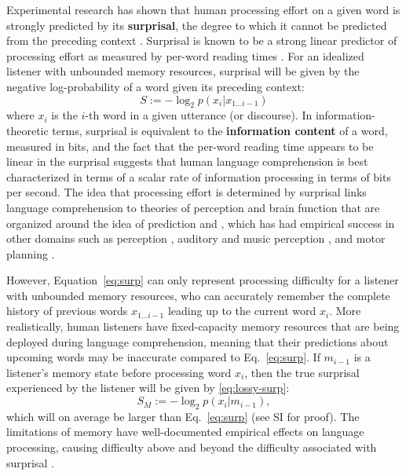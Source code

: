 \documentclass[12pt]{article}
\begin{document}
Experimental research has shown that human processing effort on a given word is strongly predicted by its \textbf{surprisal}, the degree to which it cannot be predicted from the preceding context \citep{hale2001probabilistic,levy2008expectation}.
Surprisal is known to be a strong linear predictor of processing effort as measured by per-word reading times \citep{smith2013effect}.
For an idealized listener with unbounded memory resources, surprisal will be given by the negative log-probability of a word given its preceding context:
\begin{equation}\label{eq:surp}
	S :=	-\log_2 p(x_i|x_{1...i-1})
\end{equation}
where $x_i$ is the $i$-th word in a given utterance (or discourse). In information-theoretic terms, surprisal is equivalent to the \textbf{information content} of a word, measured in bits, and the fact that the per-word reading time appears to be linear in the surprisal suggests that human language comprehension is best characterized in terms of a scalar rate of information processing in terms of bits per second. The idea that processing effort is determined by surprisal links language comprehension to theories of perception and brain function that are organized around the idea of prediction and  \citep{friston2009predictive,friston2010free,clark2013whatever}, which has had empirical success in other domains such as perception \citep{egner2010expectation}, auditory and music perception \citep{agres2018information}, and motor planning \citep{wolpert2001motor}.

However, Equation~\ref{eq:surp} can only represent processing difficulty for a listener with unbounded memory resources, who can accurately remember the complete history of previous words $x_{1...i-1}$ leading up to the current word $x_i$. More realistically, human listeners have fixed-capacity memory resources that are being deployed during language comprehension, meaning that their predictions about upcoming words may be inaccurate compared to Eq.~\ref{eq:surp}. If $m_{i-1}$ is a listener's memory state before processing word $x_i$, then the true surprisal experienced by the listener will be given by \ref{eq:lossy-surp}:
\begin{equation}
  \label{eq:lossy-surp}
  S_M := -\log_2 p(x_i|m_{i-1}),
\end{equation}
which will on average be larger than Eq.~\ref{eq:surp} (see SI for proof). %
The limitations of memory have well-documented empirical effects on language processing, causing difficulty above and beyond the difficulty associated with surprisal \citep{gibson1998linguistic,gibson1999memory,gibson2000dependency,vasishth2005activationbased,levy2013memory}.
\end{document}
